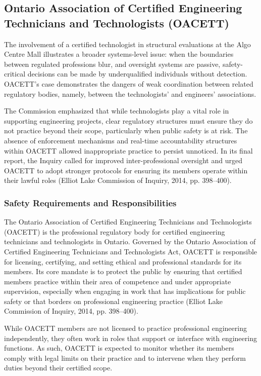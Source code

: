 \documentclass[12pt]{article}
\begin{document}
\subsection{Ontario Association of Certified Engineering Technicians and Technologists (OACETT)}
The involvement of a certified technologist in structural evaluations at the Algo Centre Mall illustrates a broader systems-level issue: when the boundaries between regulated professions blur, and oversight systems are passive, safety-critical decisions can be made by underqualified individuals without detection. OACETT’s case demonstrates the dangers of weak coordination between related regulatory bodies, namely, between the technologists’ and engineers’ associations.

The Commission emphasized that while technologists play a vital role in supporting engineering projects, clear regulatory structures must ensure they do not practice beyond their scope, particularly when public safety is at risk. The absence of enforcement mechanisms and real-time accountability structures within OACETT allowed inappropriate practice to persist unnoticed. In its final report, the Inquiry called for improved inter-professional oversight and urged OACETT to adopt stronger protocols for ensuring its members operate within their lawful roles (Elliot Lake Commission of Inquiry, 2014, pp. 398–400).

\subsubsection*{Safety Requirements and Responsibilities}
The Ontario Association of Certified Engineering Technicians and Technologists (OACETT) is the professional regulatory body for certified engineering technicians and technologists in Ontario. Governed by the Ontario Association of Certified Engineering Technicians and Technologists Act, OACETT is responsible for licensing, certifying, and setting ethical and professional standards for its members. Its core mandate is to protect the public by ensuring that certified members practice within their area of competence and under appropriate supervision, especially when engaging in work that has implications for public safety or that borders on professional engineering practice (Elliot Lake Commission of Inquiry, 2014, pp. 398–400).

While OACETT members are not licensed to practice professional engineering independently, they often work in roles that support or interface with engineering functions. As such, OACETT is expected to monitor whether its members comply with legal limits on their practice and to intervene when they perform duties beyond their certified scope.
\end{document}
